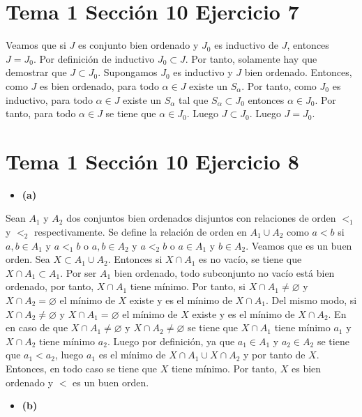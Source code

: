 \documentclass{article}
\begin{document}
\section{Tema 1 Sección 10 Ejercicio 7}
Veamos que si $J$ es conjunto bien ordenado y $J_0$ es inductivo de $J$, entonces $J=J_0$. Por definición de inductivo $J_0 \subset J$. Por tanto, solamente hay que demostrar que $J\subset J_0$. Supongamos $J_0$ es inductivo y $J$ bien ordenado. Entonces, como $J$ es bien ordenado, para todo $\alpha \in J$ existe un $S_{\alpha}$. Por tanto, como $J_0$ es inductivo, para todo $\alpha \in J$ existe un $S_{\alpha}$ tal que $S_{\alpha}\subset J_0$ entonces $\alpha \in J_{0}$. Por tanto, para todo $\alpha \in J$  se tiene que $\alpha \in J_0$. Luego $J\subset J_0$. Luego $J=J_{0}$.
\section{Tema 1 Sección 10 Ejercicio 8}
\begin{itemize}
\item \bf(a)\rm
\end{itemize}
Sean $A_1$ y $A_2$ dos conjuntos bien ordenados disjuntos con relaciones de orden $<_1$ y $<_2$ respectivamente. Se define la relación de orden en $A_1\cup A_2$ como $a<b$ si $a,b\in A_1$ y  $a<_1 b$ o $a,b\in A_2$ y  $a<_2 b$ o $a\in A_1$ y  $b\in A_2$. Veamos que es un buen orden. Sea $X\subset A_1\cup A_2$. Entonces si $X\cap A_1$ es no vacío, se tiene que $X\cap A_1\subset A_1$. Por ser $A_1$ bien ordenado, todo subconjunto no vacío está bien ordenado, por tanto, $X\cap A_1$ tiene mínimo. Por tanto, si $X\cap A_1\neq \varnothing$ y $X\cap A_2 = \varnothing$ el mínimo de $X$ existe y es el mínimo de $X\cap A_1$. Del mismo modo, si $X\cap A_2\neq \varnothing$ y $X\cap A_1= \varnothing$ el mínimo de $X$ existe y es el mínimo de $X\cap A_2$. En en caso de que $X\cap A_1\neq \varnothing$ y $X\cap A_2 \neq \varnothing$ se tiene que $X\cap A_1$ tiene mínimo $a_1$ y $X\cap A_2$ tiene mínimo $a_2$. Luego por definición, ya que $a_1\in A_1$ y $a_2\in A_2$ se tiene que $a_1<a_2$, luego $a_1$ es el mínimo de $X\cap A_1\cup X\cap A_2$ y por tanto de $X$. Entonces, en todo caso se tiene que $X$ tiene mínimo. Por tanto, $X$ es bien ordenado y $<$ es un buen orden.
\begin{itemize}
\item \bf(b)\rm
\end{itemize}
\end{document}

